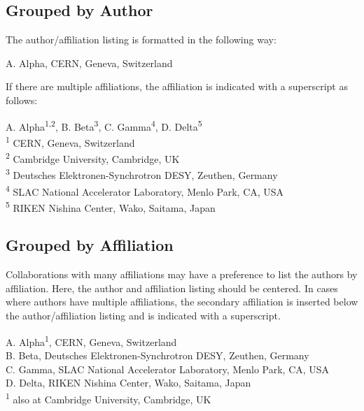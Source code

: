 \documentclass[a4paper,
               ]{jacow}
\newcommand{\TSP}[1]{\textsuperscript{#1}}
\begin{document}
\begin{strip}
\vspace*{-\baselineskip}
\setlength\parindent{10pt}

\subsection{Grouped by Author}

The author/affiliation listing is formatted in the following way:
\begin{center}
	A. Alpha, CERN, Geneva, Switzerland\\
\end{center}

If there are multiple affiliations, the affiliation is indicated with a superscript as follows:
\begin{center}
	A. Alpha\TSP{1,2}, B. Beta\TSP{3}, C. Gamma\TSP{4}, D. Delta\TSP{5} \\
	\TSP{1} CERN, Geneva, Switzerland \\
	\TSP{2} Cambridge University, Cambridge, UK \\
	\TSP{3} Deutsches Elektronen-Synchrotron DESY, Zeuthen, Germany \\
	\TSP{4} SLAC National Accelerator Laboratory, Menlo Park, CA, USA \\
	\TSP{5} RIKEN Nishina Center, Wako, Saitama, Japan \\
\end{center}


\subsection{Grouped by Affiliation}

Collaborations with many affiliations may have a preference to list the authors by affiliation. 
Here, the author and affiliation listing should be centered. 
In cases where authors have multiple affiliations, the secondary affiliation is inserted 
below the author/affiliation listing and is indicated with a superscript.
\begin{center}
	A. Alpha\TSP{1}, CERN, Geneva, Switzerland \\
	B. Beta, Deutsches Elektronen-Synchrotron DESY, Zeuthen, Germany \\
	C. Gamma, SLAC National Accelerator Laboratory, Menlo Park, CA, USA \\
	D. Delta, RIKEN Nishina Center, Wako, Saitama, Japan \\
	\TSP{1} also at Cambridge University, Cambridge, UK \\
\end{center}


\end{strip}
\end{document}
